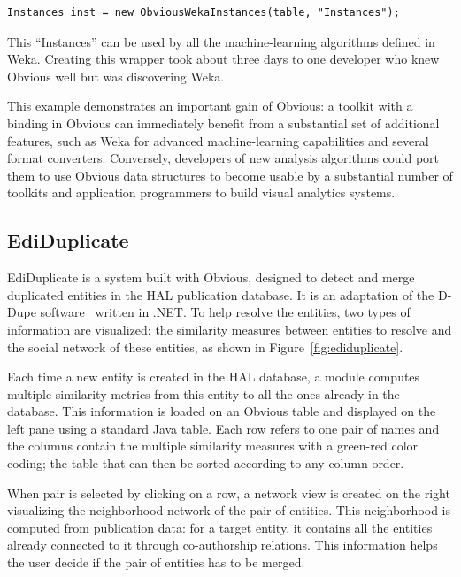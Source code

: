 \begin{lstlisting}[caption={Wrapping an Obvious Table into Weka Instances},label=wekaExample]
Instances inst = new ObviousWekaInstances(table, "Instances");
\end{lstlisting}


This ``Instances'' can be used by all the machine-learning algorithms
defined in Weka.  Creating this wrapper took about three days to one
developer who knew Obvious well but was discovering Weka.

This example demonstrates an important gain of Obvious: a toolkit with
a binding in Obvious can immediately benefit from a substantial set of
additional features, such as Weka for advanced machine-learning
capabilities and several format converters.  Conversely, developers of
new analysis algorithms could port them to use Obvious data structures
to become usable by a substantial number of toolkits and application
programmers to build visual analytics systems.


\subsection{EdiDuplicate}

EdiDuplicate is a system built with Obvious, designed to detect and
merge duplicated entities in the HAL publication database. It is an
adaptation of the D-Dupe software~\cite{DDupe} written in .NET.  To
help resolve the entities, two types of information are visualized:
the similarity measures between entities to resolve and the social
network of these entities, as shown in Figure~\ref{fig:ediduplicate}.

Each time a new entity is created in the HAL database, a module
computes multiple similarity metrics from this entity to all the ones
already in the database.  This information is loaded on an Obvious
table and displayed on the left pane using a standard Java table. Each
row refers to one pair of names and the columns contain the multiple
similarity measures with a green-red color coding; the table that can
then be sorted according to any column order.

When pair is selected by clicking on a row, a network view is created
on the right visualizing the neighborhood network of the pair of
entities.  This neighborhood is computed from publication data: for a
target entity, it contains all the entities already connected to it
through co-authorship relations.  This information helps the user
decide if the pair of entities has to be merged.

